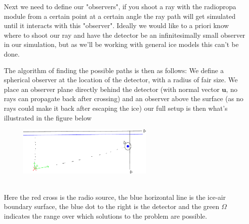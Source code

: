\documentclass[11pt,a4paper,faculty=we,language=en,doctype=report]{cls/ugent-doc}
\begin{document}
Next we need to define our "observers", if you shoot a ray with the radiopropa
module from a certain point at a certain angle the ray path will get simulated
until it interacts with this "observer".  Ideally we would like to a priori
know where to shoot our ray and have the detector be an infinitesimally small
observer in our simulation, but as we'll be working with general ice models
this can't be done.

The algorithm of finding the possible paths is then as follows: We define a
spherical observer at the location of the detector, with a radius of fair size.
We place an observer plane directly behind the detector (with normal vector
$\mathbf{u}$, no rays can propagate back after crossing) and an observer above
the surface (as no rays could make it back after escaping the ice) our full
setup is then what's illustrated in the figure below
\begin{figure}[h!]
  \centering
  \includegraphics[width=0.6\textwidth]{algoillu.pdf}
\end{figure}\\

Here the red cross is the radio source, the blue horizontal line is the ice-air
boundary surface, the blue dot to the right is the detector and the green
$\Omega$ indicates the range over which solutions to the problem are possible.
\end{document}
